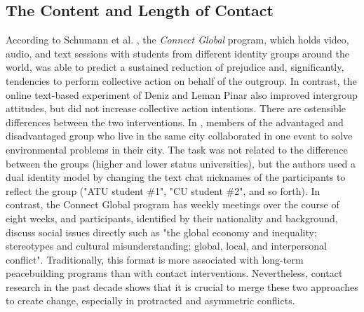 \documentclass[dissertation,math,vertlayout,pdfa,colorlinks]{aaltoseries}
\begin{document}
\subsection{The Content and Length of Contact}
According to Schumann et al. \cite{schumannWhatCanBe2022}, the \textit{Connect Global} program, which holds video, audio, and text sessions with students from different identity groups around the world, was able to predict a sustained reduction of prejudice and, significantly, tendencies to perform collective action on behalf of the outgroup. In contrast, the online text-based experiment of Deniz and Leman Pinar \cite{enicOnlineContactsSupported2024} also improved intergroup attitudes, but did not increase collective action intentions. There are ostensible differences between the two interventions. In \cite{enicOnlineContactsSupported2024}, members of the advantaged and disadvantaged group who live in the same city collaborated in one event to solve environmental problems in their city. The task was not related to the difference between the groups (higher and lower status universities), but the authors used a dual identity model by changing the text chat nicknames of the participants to reflect the group ("ATU student \#1", "CU student \#2", and so forth). In contrast, the Connect Global program has weekly meetings over the course of eight weeks, and participants, identified by their nationality and background, discuss social issues directly such as "the global economy and inequality; stereotypes and cultural misunderstanding; global, local, and interpersonal conflict". Traditionally, this format is more associated with long-term peacebuilding programs than with contact interventions. Nevertheless, contact research in the past decade shows that it is crucial to merge these two approaches to create change, especially in protracted and asymmetric conflicts.
\end{document}
